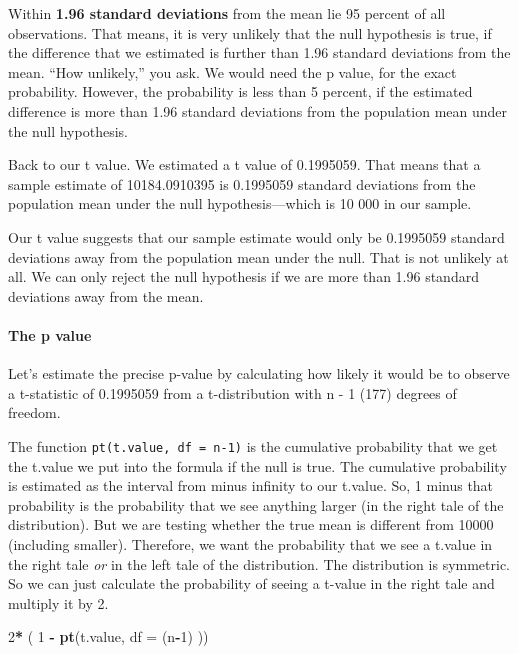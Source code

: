 \documentclass[]{article}
\newenvironment{Shaded}{\begin{snugshade}}{\end{snugshade}}
\newcommand{\KeywordTok}[1]{\textcolor[rgb]{0.13,0.29,0.53}{\textbf{#1}}}
\newcommand{\DataTypeTok}[1]{\textcolor[rgb]{0.13,0.29,0.53}{#1}}
\newcommand{\DecValTok}[1]{\textcolor[rgb]{0.00,0.00,0.81}{#1}}
\newcommand{\StringTok}[1]{\textcolor[rgb]{0.31,0.60,0.02}{#1}}
\newcommand{\OperatorTok}[1]{\textcolor[rgb]{0.81,0.36,0.00}{\textbf{#1}}}
\newcommand{\NormalTok}[1]{#1}
\let\oldparagraph\paragraph
\renewcommand{\paragraph}[1]{\oldparagraph{#1}\mbox{}}
\theoremstyle{definition}
\theoremstyle{definition}
\theoremstyle{definition}
\theoremstyle{remark}
\begin{document}
Within \textbf{1.96 standard deviations} from the mean lie 95 percent of
all observations. That means, it is very unlikely that the null
hypothesis is true, if the difference that we estimated is further than
1.96 standard deviations from the mean. ``How unlikely,'' you ask. We
would need the p value, for the exact probability. However, the
probability is less than 5 percent, if the estimated difference is more
than 1.96 standard deviations from the population mean under the null
hypothesis.

Back to our t value. We estimated a t value of 0.1995059. That means
that a sample estimate of 10184.0910395 is 0.1995059 standard deviations
from the population mean under the null hypothesis---which is 10 000 in
our sample.

Our t value suggests that our sample estimate would only be 0.1995059
standard deviations away from the population mean under the null. That
is not unlikely at all. We can only reject the null hypothesis if we are
more than 1.96 standard deviations away from the mean.

\paragraph{The p value}\label{the-p-value}

Let's estimate the precise p-value by calculating how likely it would be
to observe a t-statistic of 0.1995059 from a t-distribution with n - 1
(177) degrees of freedom.

The function \texttt{pt(t.value,\ df\ =\ n-1)} is the cumulative
probability that we get the t.value we put into the formula if the null
is true. The cumulative probability is estimated as the interval from
minus infinity to our t.value. So, 1 minus that probability is the
probability that we see anything larger (in the right tale of the
distribution). But we are testing whether the true mean is different
from 10000 (including smaller). Therefore, we want the probability that
we see a t.value in the right tale \emph{or} in the left tale of the
distribution. The distribution is symmetric. So we can just calculate
the probability of seeing a t-value in the right tale and multiply it by
2.

\begin{Shaded}
\begin{Highlighting}[]
\DecValTok{2}\OperatorTok{*}\StringTok{ }\NormalTok{( }\DecValTok{1} \OperatorTok{-}\StringTok{ }\KeywordTok{pt}\NormalTok{(t.value, }\DataTypeTok{df =}\NormalTok{ (n}\OperatorTok{-}\DecValTok{1}\NormalTok{) ))}
\end{Highlighting}
\end{Shaded}
\end{document}
